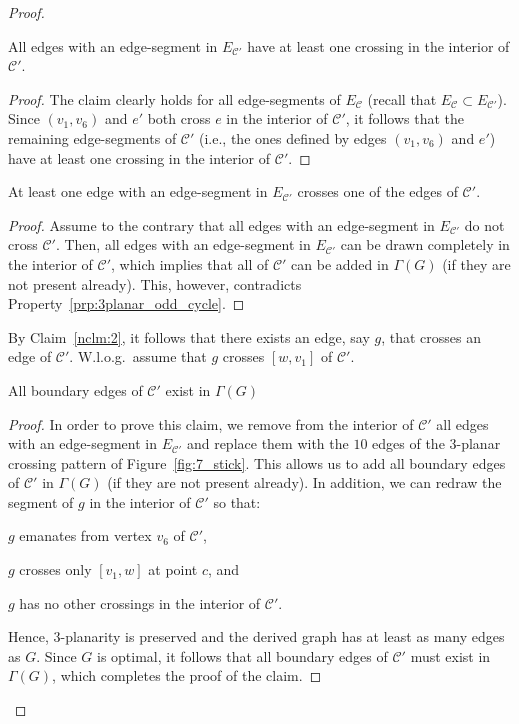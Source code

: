 \begin{proof}
\begin{claim}
All edges with an edge-segment in $E_{\mathcal{C}'}$ have at least one crossing in the interior of $\mathcal{C}'$.
\label{nclm:1}
\end{claim}
\begin{proof}
The claim clearly holds for all edge-segments of $E_{\mathcal{C}}$ (recall that $E_{\mathcal{C}}\subset E_{\mathcal{C}'}$). Since $(v_1,v_{6})$ and $e'$ both cross $e$ in the interior of $\mathcal{C}'$, it follows that the remaining edge-segments of $\mathcal{C}'$ (i.e., the ones defined by edges $(v_1,v_{6})$ and $e'$) have at least one crossing in the interior of $\mathcal{C}'$.
\end{proof}

\begin{claim}
At least one edge with an edge-segment in $E_{\mathcal{C}'}$ crosses one of the edges of $\mathcal{C}'$.
\label{nclm:2}
\end{claim}
\begin{proof}
Assume to the contrary that all edges with an edge-segment in $E_{\mathcal{C}'}$ do not cross $\mathcal{C}'$. Then, all edges with an edge-segment in $E_{\mathcal{C}'}$ can be drawn completely in the interior of $\mathcal{C}'$, which implies that all \pes of $\mathcal{C}'$ can be added in $\Gamma(G)$ (if they are not present already). This, however, contradicts Property~\ref{prp:3planar_odd_cycle}. 
\end{proof}

\noindent By Claim~\ref{nclm:2}, it follows that there exists an edge, say $g$, that crosses an edge of $\mathcal{C}'$. W.l.o.g.~assume that $g$ crosses $[w,v_1]$ of $\mathcal{C}'$.

\begin{claim}
All boundary edges of $\mathcal{C}'$ exist in $\Gamma(G)$
\label{nclm:3}
\end{claim}
\begin{proof}
In order to prove this claim, we remove from the interior of  $\mathcal{C}'$ all edges with an edge-segment in $E_{\mathcal{C}'}$ and replace them with the $10$ edges of the $3$-planar crossing pattern of Figure~\ref{fig:7_stick}. This allows us to add all boundary edges of  $\mathcal{C}'$ in $\Gamma(G)$ (if they are not present already). In addition, we can redraw the segment of $g$ in the interior of $\mathcal{C}'$ so that: %
\begin{inparaenum}[(i)]
\item $g$ emanates from vertex $v_6$ of $\mathcal{C}'$,
\item $g$ crosses only \pe $[v_1,w]$ at point $c$, and
\item $g$ has no other crossings in the interior of  $\mathcal{C}'$.
\end{inparaenum}
Hence, $3$-planarity is preserved and the derived graph has at least as many edges as $G$. Since $G$ is optimal, it follows that all boundary edges of $\mathcal{C}'$ must exist in $\Gamma(G)$, which completes the proof of the claim.
\end{proof}


\end{proof}
